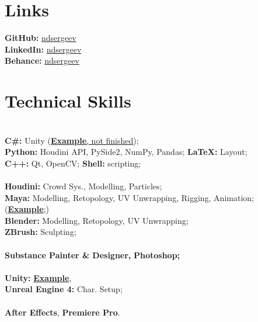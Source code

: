 \documentclass[]{cv-class}
\begin{document}
\begin{minipage}[t]{0.3\textwidth}
\section{Links}
\textcolor{subsec_col}{\textbf{GitHub:}} \href{https://github.com/ndsergeev}{ndsergeev} \\
\textcolor{subsec_col}{\textbf{LinkedIn:}} \href{https://www.linkedin.com/in/ndsergeev/}{ndsergeev} \\
\textcolor{subsec_col}{\textbf{Behance:}} \href{https://www.behance.net/ndsergeev}{ndsergeev}

\smallSeparator{0.4pt}
\section{Technical Skills}
{} \\
\textbf{C\#:} Unity (\href{https://github.com/ndsergeev/pacman2D}{\textbf{Example}{, not finished}}); \\
\textbf{Python:} Houdini API, PySide2, NumPy, Pandas; \textbf{\LaTeX:} Layout;\\
\textbf{C++:} Qt, OpenCV;
\textbf{Shell:} scripting; \\

{} \\
\textbf{Houdini:} Crowd Sys., Modelling, Particles; \\
\textbf{Maya:} Modelling, Retopology, UV Unwrapping, Rigging, Animation; (\href{https://youtu.be/K4u4sFvCkjE}{\textbf{Example};})\\
\textbf{Blender:} Modelling, Retopology, UV Unwrapping; \\
\textbf{ZBrush:} Sculpting; \\

{} \\
\textbf{Substance Painter \&}
\textbf{Designer,}
\textbf{Photoshop;} \\

{} \\
\textbf{Unity:} \href{https://github.com/anskuratov/ar-mr-therapy}{\textbf{Example}},\\
\textbf{Unreal Engine 4:} Char. Setup; \\

{} \\
\textbf{After Effects},
\textbf{Premiere Pro}.


\end{minipage}
\end{document}
